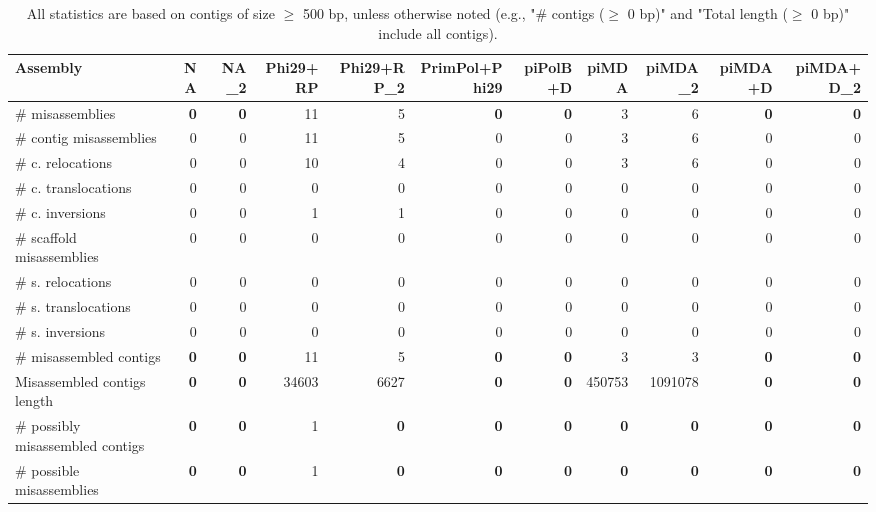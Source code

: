 \documentclass[12pt,a4paper]{article}
\begin{document}
\begin{table}[ht]
\begin{center}
\caption{All statistics are based on contigs of size $\geq$ 500 bp, unless otherwise noted (e.g., "\# contigs ($\geq$ 0 bp)" and "Total length ($\geq$ 0 bp)" include all contigs).}
\begin{tabular}{|l*{10}{|r}|}
\hline
Assembly & NA & NA\_2 & Phi29+RP & Phi29+RP\_2 & PrimPol+Phi29 & piPolB+D & piMDA & piMDA\_2 & piMDA+D & piMDA+D\_2 \\ \hline
\# misassemblies & {\bf 0} & {\bf 0} & 11 & 5 & {\bf 0} & {\bf 0} & 3 & 6 & {\bf 0} & {\bf 0} \\ \hline
\hspace{2mm}\# contig misassemblies & 0 & 0 & 11 & 5 & 0 & 0 & 3 & 6 & 0 & 0 \\ \hline
\hspace{5mm}\# c. relocations & 0 & 0 & 10 & 4 & 0 & 0 & 3 & 6 & 0 & 0 \\ \hline
\hspace{5mm}\# c. translocations & 0 & 0 & 0 & 0 & 0 & 0 & 0 & 0 & 0 & 0 \\ \hline
\hspace{5mm}\# c. inversions & 0 & 0 & 1 & 1 & 0 & 0 & 0 & 0 & 0 & 0 \\ \hline
\hspace{2mm}\# scaffold misassemblies & 0 & 0 & 0 & 0 & 0 & 0 & 0 & 0 & 0 & 0 \\ \hline
\hspace{5mm}\# s. relocations & 0 & 0 & 0 & 0 & 0 & 0 & 0 & 0 & 0 & 0 \\ \hline
\hspace{5mm}\# s. translocations & 0 & 0 & 0 & 0 & 0 & 0 & 0 & 0 & 0 & 0 \\ \hline
\hspace{5mm}\# s. inversions & 0 & 0 & 0 & 0 & 0 & 0 & 0 & 0 & 0 & 0 \\ \hline
\# misassembled contigs & {\bf 0} & {\bf 0} & 11 & 5 & {\bf 0} & {\bf 0} & 3 & 3 & {\bf 0} & {\bf 0} \\ \hline
Misassembled contigs length & {\bf 0} & {\bf 0} & 34603 & 6627 & {\bf 0} & {\bf 0} & 450753 & 1091078 & {\bf 0} & {\bf 0} \\ \hline
\# possibly misassembled contigs & {\bf 0} & {\bf 0} & 1 & {\bf 0} & {\bf 0} & {\bf 0} & {\bf 0} & {\bf 0} & {\bf 0} & {\bf 0} \\ \hline
\hspace{5mm}\# possible misassemblies & {\bf 0} & {\bf 0} & 1 & {\bf 0} & {\bf 0} & {\bf 0} & {\bf 0} & {\bf 0} & {\bf 0} & {\bf 0} \\ \hline

\end{tabular}
\end{center}
\end{table}
\end{document}
